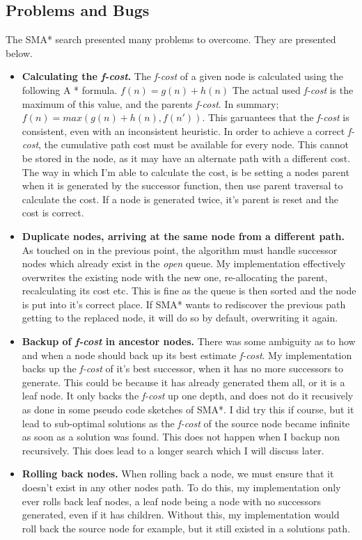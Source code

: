 \documentclass[]{article}
\begin{document}
\subsection*{Problems and Bugs}
The SMA* search presented many problems to overcome. They are presented below.
\begin{itemize}
	\item \textbf{Calculating the \textit{f-cost}.} The \textit{f-cost} of a given node is calculated using the following A * formula. $ f(n) = g(n) + h(n) $ The actual used \textit{f-cost} is the maximum of this value, and the parents \textit{f-cost}. In summary; $ f(n)= max(g(n) + h(n), f(n'))$. This garuantees that the \textit{f-cost} is consistent, even with an inconsistent heuristic. \cite{}
	In order to achieve a correct \textit{f-cost}, the cumulative path cost must be available for every node. This cannot be stored in the node, as it may have an alternate path with a different cost. The way in which I'm able to calculate the cost, is be setting a nodes parent when it is generated by the successor function, then use parent traversal to calculate the cost. If a node is generated twice, it's parent is reset and the cost is correct.
	\item \textbf{Duplicate nodes, arriving at the same node from a different path.} As touched on in the previous point, the algorithm must handle successor nodes which already exist in the \textit{open} queue. My implementation effectively overwrites the existing node with the new one, re-allocating the parent, recalculating its cost etc. This is fine as the queue is then sorted and the node is put into it's correct place. If SMA* wants to rediscover the previous path getting to the replaced node, it will do so by default, overwriting it again.
	\item \textbf{Backup of \textit{f-cost} in ancestor nodes.} There was some ambiguity as to how and when a node should back up its best estimate \textit{f-cost}. My implementation backs up the \textit{f-cost} of it's best successor, when it has no more successors to generate. This could be because it has already generated them all, or it is a leaf node. It only backs the \textit{f-cost} up one depth, and does not do it recusively as done in some pseudo code sketches of SMA*. I did try this if course, but it lead to sub-optimal solutions as the \textit{f-cost} of the source node became infinite as soon as a solution was found. This does not happen when I backup non recursively. This does lead to a longer search which I will discuss later.
	\item \textbf{Rolling back nodes.} When rolling back a node, we must ensure that it doesn't exist in any other nodes path. To do this, my implementation only ever rolls back leaf nodes, a leaf node being a node with no successors generated, even if it has children. Without this, my implementation would roll back the source node for example, but it still existed in a solutions path.

\end{itemize}
\end{document}
